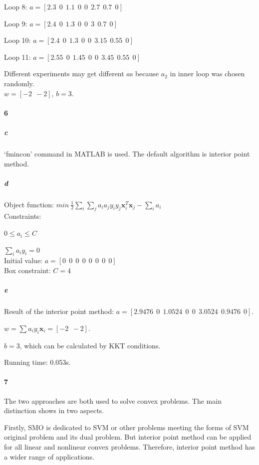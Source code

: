 \documentclass[22pt]{article}
\begin{document}
		Loop 8: $a = [2.3\ \        0 \ \    1.1\ \        0\ \          0\ \     2.7\ \    0.7\ \         0]$

		Loop 9: $a = [2.4\ \          0\ \     1.3\ \          0\ \         0\ \    3\ \     0.7 \ \          0]$

		Loop 10: $a = [2.4\ \         0\ \    1.3\ \         0 \ \        0\ \    3.15\ \    0.55\ \         0]$

		Loop 11: $a = [2.55\ \    0\ \    1.45\ \         0\ \          0\ \    3.45 \ \  0.55\ \          0]$

		Different experiments may get different $a$s because $a_2$ in inner loop was chosen randomly.\\[1ex]

		$w = [-2\ \  -2]$, $b = 3$.

	\paragraph{6}
		\subparagraph{c} `fmincon' command in MATLAB is used. The default algorithm is interior point method.

		\subparagraph{d}
		Object function: $min\ \frac{1}{2}\sum_i\sum_ja_ia_jy_iy_j\mathbf{x}^T_i\mathbf{x}_j - \sum_ia_i$\\
		
		Constraints:
		
		$0\leq a_i \leq C$
		
		$\sum_ia_iy_i = 0$\\

		Initial value:
		$a = [0\ \ 0\ \ 0\ \  0\ \  0\ \  0\  \ 0\ \  0]$\\

		Box constraint: $C = 4$


		\subparagraph{e}Result of the interior point method:
		$a = [2.9476\ \     0 \ \  1.0524  \ \   0\ \  0\ \   3.0524 \ \     0.9476\  \    0 ]$.

		$w = \sum a_iy_i\mathbf{x}_i = [-2\ \ -2]$.

		$b = 3$, which can be calculated by KKT conditions.

		Running time: 0.053s.

	\paragraph{7} The two approaches are both used to solve convex problems. The main distinction shows in two aspects.

	Firstly, SMO is dedicated to SVM or other problems meeting the forms of SVM original problem and its dual problem. But interior point method can be applied for all linear and nonlinear convex problems. Therefore, interior point method has a wider range of applications.
\end{document}
